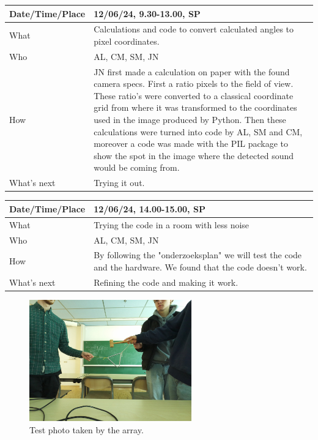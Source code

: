 \documentclass{article}
\begin{document}
\begin{table}[H]
\begin{tabular}{|p{1.5in}|p{4in}|}
\hline
Date/Time/Place & 12/06/24, 9.30-13.00, SP \\ \hline
What            & Calculations and code to convert calculated angles to pixel coordinates. \\ \hline
Who             & AL, CM, SM, JN \\ \hline
How             & JN first made a calculation on paper with the found camera specs. First a ratio pixels to the field of view. These ratio's were converted to a classical coordinate grid from where it was transformed to the coordinates used in the image produced by Python. Then these calculations were turned into code by AL, SM and CM, moreover a code was made with the PIL package to show the spot in the image where the detected sound would be coming from.\\ \hline
What's next     & Trying it out. \\ \hline
\end{tabular}
\end{table}

\begin{table}[H]
\begin{tabular}{|p{1.5in}|p{4in}|}
\hline
Date/Time/Place &  12/06/24, 14.00-15.00, SP\\ \hline
What            & Trying the code in a room with less noise \\ \hline
Who             &  AL, CM, SM, JN\\ \hline
How             & By following the "onderzoeksplan" we will test the code and the hardware. We found that the code doesn't work. \\ \hline
What's next     & Refining the code and making it work. \\ \hline
\end{tabular}
\end{table}

\begin{figure}[H]
    \centering
    \includegraphics[width=7cm]{savedimage.jpg}
    \caption{Test photo taken by the array.}   
\end{figure}
\end{document}
